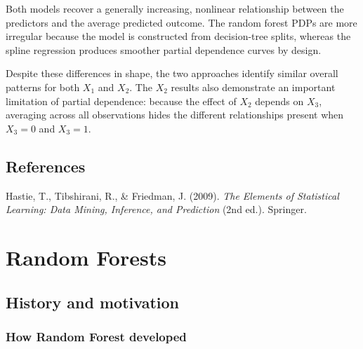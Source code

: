 \documentclass[
  letterpaper,
  DIV=11,
  numbers=noendperiod]{scrreprt}
\begin{document}
Both models recover a generally increasing, nonlinear relationship
between the predictors and the average predicted outcome. The random
forest PDPs are more irregular because the model is constructed from
decision-tree splits, whereas the spline regression produces smoother
partial dependence curves by design.

Despite these differences in shape, the two approaches identify similar
overall patterns for both \(X_1\) and \(X_2\). The \(X_2\) results also
demonstrate an important limitation of partial dependence: because the
effect of \(X_2\) depends on \(X_3\), averaging across all observations
hides the different relationships present when \(X_3 = 0\) and
\(X_3 = 1\).

\section{References}\label{references}

Hastie, T., Tibshirani, R., \& Friedman, J. (2009). \emph{The Elements
of Statistical Learning: Data Mining, Inference, and Prediction} (2nd
ed.). Springer.


\chapter{Random Forests}\label{random-forests}

\section{History and motivation}\label{history-and-motivation}

\subsection{How Random Forest
developed}\label{how-random-forest-developed}
\end{document}
